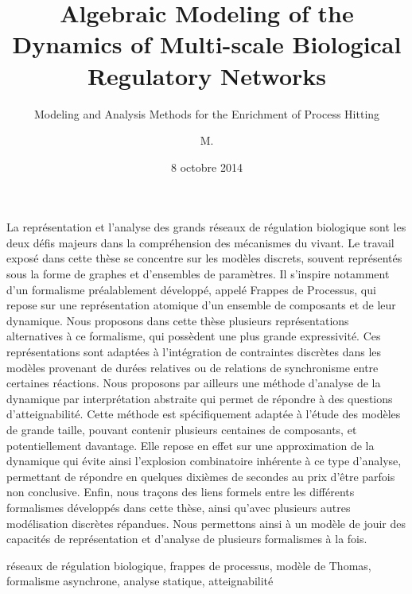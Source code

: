 \documentclass[12pt,french,francais,nofancyChapter,nofancyPart]{these-LUNAM}
\title{Algebraic Modeling of the Dynamics of Multi-scale
  Biological Regulatory Networks}
\subtitle{Modeling and Analysis Methods for the Enrichment of Process Hitting}
\author{M.}{Maxime}{Folschette}
\date{8 octobre 2014}
\theoremstyle{definition}
\theoremstyle{remark}
\begin{document}
\begin{resume}
  \scriptsize
  La représentation et l'analyse des grands réseaux de régulation biologique
  sont les deux défis majeurs dans la compréhension des mécanismes du vivant.
  Le travail exposé dans cette thèse se concentre sur les modèles discrets,
  souvent représentés sous la forme de graphes et d'ensembles de paramètres.
  Il s'inspire notamment d'un formalisme préalablement développé,
  appelé Frappes de Processus,
  qui repose sur une représentation atomique d'un ensemble de composants et de leur dynamique.
  Nous proposons dans cette thèse plusieurs représentations alternatives à
  ce formalisme, qui possèdent une plus grande expressivité.
  Ces représentations sont adaptées à l'intégration
  de contraintes discrètes dans les modèles
  provenant de durées relatives ou de relations de synchronisme entre certaines réactions.
  Nous proposons par ailleurs
  une méthode d'analyse de la dynamique par interprétation abstraite
  qui permet de répondre à des questions d'atteignabilité.
  Cette méthode est spécifiquement adaptée à l'étude des modèles de grande taille,
  pouvant contenir plusieurs centaines de composants, et potentiellement davantage.
  Elle repose en effet sur une approximation de la dynamique qui évite ainsi
  l'explosion combinatoire inhérente à ce type d'analyse,
  permettant de répondre en quelques dixièmes de secondes au prix d'être parfois non conclusive.
  Enfin, nous traçons des liens formels entre
  les différents formalismes développés dans cette
  thèse, ainsi qu'avec plusieurs autres modélisation discrètes répandues.
  Nous permettons ainsi à un modèle de jouir des capacités de représentation et d'analyse
  de plusieurs formalismes à la fois.
\end{resume}

\begin{motscles}
  réseaux de régulation biologique,
  frappes de processus,
  modèle de Thomas,
  formalisme asynchrone,
  analyse statique,
  atteignabilité
\end{motscles}
\end{document}
